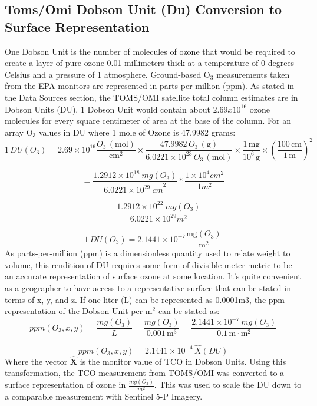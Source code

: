 \subsection{Toms/Omi Dobson Unit (Du) Conversion to Surface Representation} \label{methods:tomi} One Dobson Unit is the number of molecules of ozone that would be required to create a layer of pure ozone 0.01 millimeters thick at a temperature of 0 degrees Celsius and a pressure of 1 atmosphere. Ground-based O$_3$ measurements taken from the EPA monitors are represented in parts-per-million (ppm). As stated in the Data Sources section, the TOMS/OMI satellite total column estimates are in Dobson Units (DU). 1 Dobson Unit would contain about $2.69x10^{16}$ ozone molecules for every square centimeter of area at the base of the column. For an array O$_3$ values in DU where 1 mole of Ozone is 47.9982 grams:
\[
1\,DU(O_3) = 2.69 \times 10^{16} \frac{O_3\,(\text{mol})}{\text{cm}^2} 
\times \frac{47.9982\,O_3\,(\text{g})}{6.0221 \times 10^{23}\,O_3\,(\text{mol})} 
\times \frac{1\,\text{mg}}{10^6\,\text{g}} 
\times \left(\frac{100\,\text{cm}}{1\,\text{m}}\right)^2 
\]

\[
=\frac{1.2912\times{10}^{18}\ mg\left(O_3\right)}{{6.0221\times{10}^{29}\ cm}^2}\ast\frac{1\times{10}^4cm^2}{1m^2}
\]

\[
=\frac{1.2912\times{10}^{22}\ mg\left(O_3\right)}{6.0221\times{10}^{29}m^2}
\]

\[
1\,DU(O_3) = 2.1441 \times 10^{-7} \frac{\text{mg}(O_3)}{\text{m}^2}
\]
As parts-per-million (ppm) is a dimensionless quantity used to relate weight to volume, this rendition of DU requires some form of divisible meter metric to be an accurate representation of surface ozone at some location. It’s quite convenient as a geographer to have access to a representative surface that can be stated in terms of x, y, and z. If one liter (L) can be represented as 0.0001m3, the ppm representation of the Dobson Unit per m$^2$ can be stated as:
\[
ppm(O_3, x, y) 
= \frac{mg(O_3)}{L} 
= \frac{mg(O_3)}{0.001\,\text{m}^3} 
= \frac{2.1441 \times 10^{-7}\,mg(O_3)}{0.1\,\text{m} \cdot \text{m}^2}
\]

\[
ppm(O_3, x, y) = 2.1441 \times 10^{-4} \,\hat{X}(DU)
\]
Where the vector $\hat{\mathbf{X}}$ is the monitor value of TCO in Dobson Units. Using this transformation, the TCO measurement from TOMS/OMI was converted to a surface representation of ozone in $\frac{mg\left(O_3\right)}{m^2}$. This was used to scale the DU down to a comparable measurement with Sentinel 5-P Imagery.
